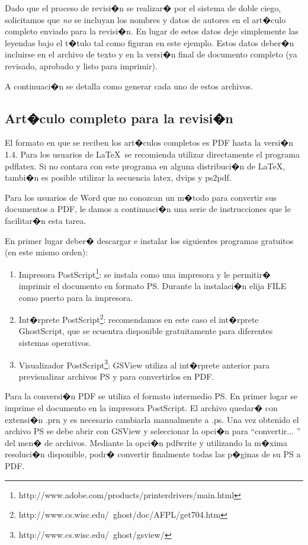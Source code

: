 \documentclass[conference,a4paper,10pt,oneside,final]{tfmpd}
\begin{document}
Dado que el proceso de revisi�n se realizar� por el sistema de doble ciego, solicitamos que \textit{no} se incluyan los nombres y datos de autores en el art�culo completo enviado para la revisi�n. En lugar de estos datos deje simplemente las leyendas bajo el t�tulo tal como figuran en este ejemplo. Estos datos deber�n incluirse en el archivo de texto y en la versi�n final de documento completo (ya revisado, aprobado y listo para imprimir).

A continuaci�n se detalla como generar cada uno de estos archivos.

\subsection{Art�culo completo para la revisi�n}

El formato en que se reciben los art�culos completos es PDF hasta la versi�n 1.4. Para los usuarios de \LaTeX\ se recomienda utilizar directamente el programa pdflatex. Si no contara con este programa en alguna distribuci�n de \LaTeX, tambi�n es posible utilizar la secuencia latex, dvips y ps2pdf.

Para los usuarios de Word que no conozcan un m�todo para convertir sus documentos a PDF, le damos a continuaci�n una serie de instrucciones que le facilitar�n esta tarea.

En primer lugar deber� descargar e instalar los siguientes programas 
gratuitos (en este mismo orden):

\begin{enumerate}
\item Impresora PostScript\footnote{http://www.adobe.com/products/printerdrivers/main.html}:
se instala como una impresora y le permitir� imprimir el documento en formato PS. Durante la instalaci�n elija FILE como puerto para la impresora.

\item Int�rprete PostScript\footnote{http://www.cs.wisc.edu/~ghost/doc/AFPL/get704.htm}:
recomendamos en este caso el int�rprete GhostScript, que se ecuentra disponible gratuitamente para diferentes sistemas operativos.

\item Visualizador PostScript\footnote{http://www.cs.wisc.edu/~ghost/gsview/}:
GSView utiliza al int�rprete anterior para previsualizar archivos PS y para convertirlos en PDF.
\end{enumerate}

Para la conversi�n PDF se utiliza el formato intermedio PS. En primer logar se imprime el documento en la impresora PostScript. El archivo quedar� con extensi�n .prn y es necesario cambiarla manualmente a .ps. Una vez obtenido el archivo PS se debe abrir con GSView y seleccionar la opci�n para ``convertir... '' del men� de archivos. Mediante 
la opci�n pdfwrite y utilizando la m�xima resoluci�n disponible, podr� convertir finalmente todas las p�ginas de su PS a PDF.
\end{document}
